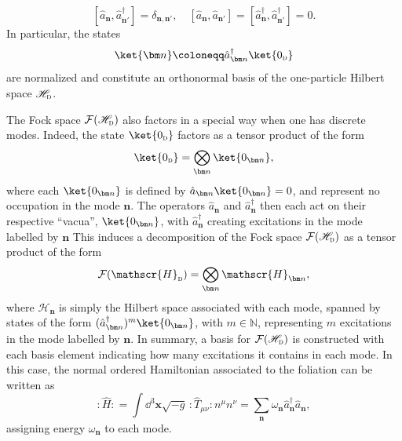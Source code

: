 \documentclass[letterpaper,12pt,titlepage,oneside,final]{book}
\newcommand{\normord}[1]{\vcentcolon\mathrel{#1}\vcentcolon}
\providecommand{\vcentcolon}{\mathrel{\mathop{:}}}
\newcommand{\tc}[1]{\textsc{#1}}
\begin{document}
\begin{equation}\label{eq:CCRphid}
    [\hat{a}_{\bm n},\hat{a}_{\bm n'}^\dagger] = \delta_{\bm n, \bm n'}, \quad [\hat{a}_{\bm n},\hat{a}_{\bm n'}] = [\hat{a}_{\bm n}^\dagger,\hat{a}_{\bm n'}^\dagger] = 0.
\end{equation}
In particular, the states
\begin{equation}
    \ket{\bm n} \coloneqq \hat{a}_{\bm n}^\dagger \ket{0_\tc{d}}
\end{equation}
are normalized and constitute an orthonormal basis of the one-particle Hilbert space $\mathscr{H}_\tc{d}$.

The Fock space $\mathcal{F}(\mathscr{H}_\tc{d})$ also factors in a special way when one has discrete modes. Indeed, the state $\ket{0_\tc{d}}$ factors as a tensor product of the form
\begin{equation}\label{eq:vacTensor}
    \ket{0_\tc{d}} = \bigotimes_{\bm n} \ket{0_{\bm n}},
\end{equation}
where each $\ket{0_{\bm n}}$ is defined by $\hat{a}_{\bm n}\ket{0_{\bm n}} = 0$, and represent no occupation in the mode $\bm n$. The operators $\hat{a}_{\bm n}$ and $\hat{a}_{\bm n}^\dagger$ then each act on their respective ``vacua'', $\ket{0_{\bm n}}$, with $\hat{a}_{\bm n}^\dagger$ creating excitations in the mode labelled by $\bm n$ This induces a decomposition of the Fock space $\mathcal{F}(\mathscr{H}_\tc{d})$ as a tensor product of the form
\begin{equation}\label{eq:Fockphid}
    \mathcal{F}(\mathscr{H}_\tc{d}) ={\bigotimes_{\bm n}\,} \mathscr{H}_{\bm n},
\end{equation}
where $\mathscr{H}_{\bm n}$ is simply the Hilbert space associated with each mode, spanned by states of the form $(\hat{a}_{\bm n}^\dagger)^m\ket{0_{\bm n}}$, with $m \in \mathbb{N}$, representing $m$ excitations in the mode labelled by $\bm n$. In summary, a basis for $\mathcal{F}(\mathscr{H}_\tc{d})$ is constructed with each basis element indicating how many excitations it contains in each mode. In this case, the normal ordered Hamiltonian associated to the foliation can be written as
\begin{equation}
    :\!\hat{H}\!: = \int \dd^3 \bm x \sqrt{-g}\,\normord{\hat{T}_{\mu\nu}}  n^\mu n^\nu  = \sum_{\bm n} \omega_{\bm n} \hat{a}_{\bm n}^\dagger \hat{a}_{\bm n},
\end{equation}
assigning energy $\omega_{\bm n}$ to each mode. 


\end{document}

